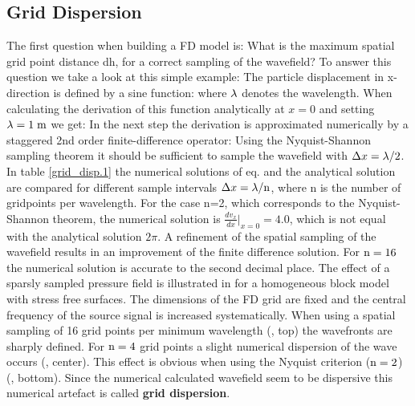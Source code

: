 \documentclass[11pt,onecolumn,oneside]{article}
\begin{document}
\subsection{Grid Dispersion}\label{grid-dispersion}
The first question when building a FD model is: What is the maximum spatial grid point distance dh, for a correct sampling of the wavefield? To answer this question we take a look at this simple example: The particle displacement in x-direction is defined by a sine function:
where $\rm{\lambda}$ denotes the wavelength. When calculating the derivation of this function analytically at $x=0$ and setting $\rm{\lambda}=1\;\rm{m}$ we get:
In the next step the derivation is approximated numerically by a staggered 2nd order finite-difference operator:
Using the Nyquist-Shannon sampling theorem it should be sufficient to sample the wavefield with $\Delta x = \rm{\lambda}/2$. In table \ref{grid_disp.1} the
numerical solutions of eq.  and the analytical solution  are compared for different sample intervals 
$\Delta x = \rm{\lambda} /n$, where n is the number of gridpoints per wavelength. For the case n=2, which corresponds to the Nyquist-Shannon theorem, the
numerical solution is $\frac{d v_x}{d x}|_{x=0}=4.0$, which is not equal with the analytical solution $2 \pi$. A refinement of the spatial
sampling of the wavefield results in an improvement of the finite difference solution. For $\rm n=16$ the numerical solution is accurate to the second
decimal place. The effect of a sparsly sampled pressure field is illustrated in  for a homogeneous block model with stress free surfaces. The dimensions of the FD grid are fixed
and the central frequency of the source signal is increased systematically. 
When using a spatial sampling of 16 grid points per minimum wavelength (, top) the wavefronts are sharply defined. For $\rm n=4$ 
grid points a slight numerical dispersion of the wave occurs (, center). This effect is obvious when using the Nyquist criterion ($\rm n=2$) 
(, bottom). Since the numerical calculated wavefield seem to be dispersive this numerical artefact is called {\bf{grid dispersion}}. 
\end{document}
